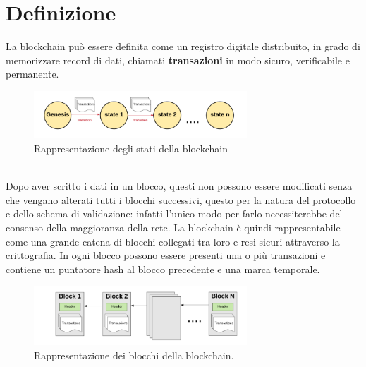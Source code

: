 \documentclass[a4paper,11pt]{report}
\begin{document}
\section{Definizione}
La blockchain può essere definita come un registro digitale distribuito, in grado di memorizzare record di dati, chiamati \textbf{transazioni} in modo sicuro, verificabile e permanente. \\
\begin{figure}[htbp] 
\begin{center}
\includegraphics[width=8cm]{img/genesis.png} 
\end{center}
\caption{Rappresentazione degli stati della blockchain \cite{genesis}}
\end{figure}
\\Dopo aver scritto i dati in un blocco, questi non possono essere modificati senza che vengano alterati tutti i blocchi successivi, questo per la natura del protocollo e dello schema di validazione: infatti l'unico modo per farlo necessiterebbe del consenso della maggioranza della rete. La blockchain è quindi rappresentabile come una grande catena di blocchi collegati tra loro e resi sicuri attraverso la crittografia. In ogni blocco possono essere presenti una o più transazioni e contiene un puntatore hash al blocco precedente e una marca temporale. \\

\begin{figure}[htbp] 
\begin{center}
\includegraphics[width=8cm]{img/blkc.png} 
\end{center}
\caption{Rappresentazione dei blocchi della blockchain. \cite{genesis}}
\end{figure}
\end{document}
